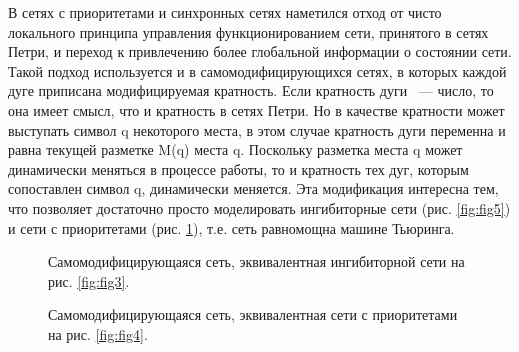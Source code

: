В сетях с приоритетами и синхронных сетях наметился отход от чисто локального принципа управления функционированием сети, принятого в сетях Петри, и переход к привлечению более глобальной информации о состоянии сети. Такой подход используется и в самомодифицирующихся сетях, в которых каждой дуге приписана модифицируемая кратность. Если кратность дуги ~--- число, то она имеет смысл, что и кратность в сетях Петри. Но в качестве кратности может выступать символ q некоторого места, в этом случае кратность дуги переменна и равна текущей разметке M(q) места q. Поскольку разметка места q может динамически меняться в процессе работы, то и кратность тех дуг, которым сопоставлен символ q, динамически меняется. Эта модификация интересна тем, что позволяет достаточно просто моделировать ингибиторные сети (рис. \ref{fig:fig5}) и сети с приоритетами (рис. \ref{fig:fig6}), т.е. сеть равномощна машине Тьюринга.

\begin{figure}
	\begin{minipage}[H]{0.49\linewidth}
		\caption{Самомодифицирующаяся сеть, эквивалентная ингибиторной сети на рис. \ref{fig:fig3}.}
		\label{fig:fig5}
	\end{minipage}
	\hfill
	\begin{minipage}[H]{0.49\linewidth}
		\caption{Самомодифицирующаяся сеть, эквивалентная сети с приоритетами на рис. \ref{fig:fig4}.}
		\label{fig:fig6}
	\end{minipage}
\end{figure}


